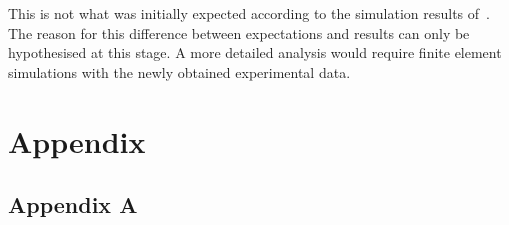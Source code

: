 \documentclass[12pt, a4paper, twoside]{report}
\begin{document}
This is not what was initially expected according to the simulation results of~\cite{wili_virtual_2022}.
The reason for this difference between expectations and results can only be hypothesised at this stage.
A more detailed analysis would require finite element simulations with the newly obtained experimental data.


\newpage
%
%
\appendix
\chapter{Appendix}
\newpage
\section*{Appendix A}

\newpage
%
%
%

%

%
\backmatter



\end{document}
